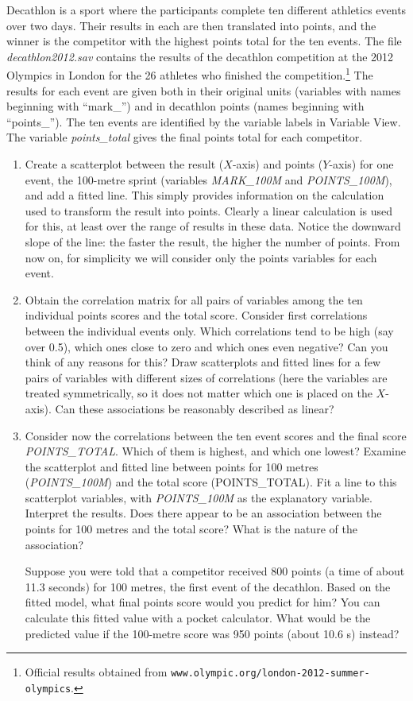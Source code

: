 Decathlon is a sport where the participants complete ten different
athletics events over two days. Their results in each are then
translated into points, and the winner is the competitor with the
highest points total for the ten events. The file \emph{decathlon2012.sav} contains
the results of the decathlon competition at the 2012 Olympics in London
for the 26 athletes who finished the competition.\footnote{Official
results obtained from
\texttt{www.olympic.org/london-2012-summer-olympics}.}
The results for each
event are given both in their original units (variables with names
beginning with ``mark\_'') and in decathlon points (names beginning with
``points\_''). The ten events are identified by the variable labels in Variable View.
The variable \emph{points\_total} gives the final points total for each competitor.

\newpage
\begin{enumerate}
\item
Create a scatterplot between the result ($X$-axis) and points ($Y$-axis)
for one event, the 100-metre sprint (variables \emph{MARK\_100M} and
\emph{POINTS\_100M}), and add a fitted line. This simply provides information on
the calculation used to transform the result into points. Clearly a
linear calculation is used for this, at least over the range
of results in these data. Notice the downward slope of the line: the faster the
result, the higher the number of points. From now on, for simplicity we will
consider only the points variables for each event.
\item
Obtain the correlation matrix for all pairs of variables among the ten
individual points scores and the total score. Consider first correlations
between the individual events only. Which correlations
tend to be high (say over 0.5), which ones close to zero and which ones
even negative? Can you think of any reasons for this? Draw scatterplots
and fitted lines for a few pairs of variables with different sizes of
correlations (here the variables are treated symmetrically, so it does
not matter which one is placed on the $X$-axis). Can these associations
be reasonably described as linear?
\item
Consider now the correlations between the ten event scores and the final
score \emph{POINTS\_TOTAL}. Which of them is highest, and which one lowest?
Examine the scatterplot and fitted line between points for 100 metres
(\emph{POINTS\_100M}) and the total score (POINTS\_TOTAL). Fit a line
to this scatterplot variables, with \emph{POINTS\_100M} as the
explanatory variable. Interpret the results. Does there appear to be an
 association between the points for 100 metres and the total score? What is the
 nature of the association?

Suppose you were told that a competitor received 800 points (a time of
about 11.3 seconds) for 100 metres, the first event of the decathlon.
Based on the fitted model, what final points score would you predict for
him? You can calculate this fitted value with a pocket calculator.
What would be the predicted value if the 100-metre score was
950 points (about 10.6 s) instead?
\end{enumerate}

